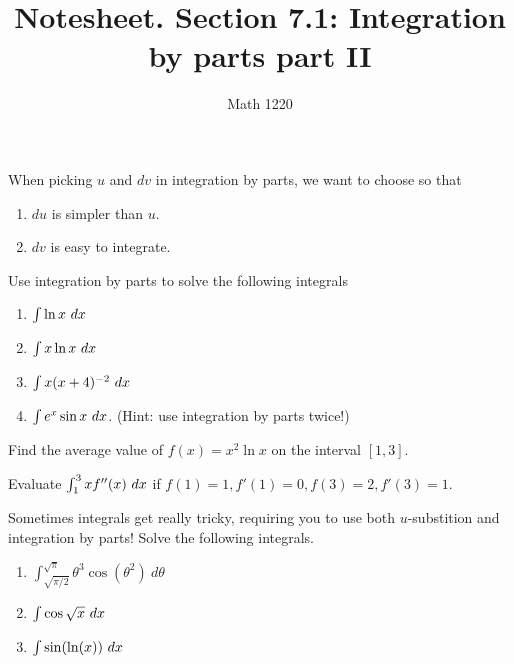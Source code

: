 \documentclass[12pt, a4paper]{article}
\author{Math 1220}
\title{Notesheet. Section 7.1: 
  Integration by parts part II}
\date{}
\begin{document}
\maketitle
\nameline
\begin{rmk}
  When picking \(u\) and \(dv\) in integration by parts, we want to
  choose so that
  \begin{enumerate}
  \item \(du\) is simpler than \(u\).
  \item \(dv\) is easy to integrate.
  \end{enumerate}
\end{rmk}
\begin{ex}
  Use integration by parts to solve the following integrals
  \begin{enumerate}
  \item \(\int \ln x \ d x\)
    \vspace{1in}
  \item \(\int x \ln x \ d x\)
    \vspace{1in}
  \item \(\int x (x+4)^{-2} \ d x\)
    \vspace{1in}
  \item \(\int e^x \sin x \ d x\). (Hint: use integration by parts twice!)
  \end{enumerate}
\end{ex}
\begin{ex}
  Find the average value of \(f(x) = x^2 \ln x\) on the interval \([1,3]\).
\end{ex}
\begin{ex}
  Evaluate \(\int_1^3 x f''(x) \ d x\) if \(f(1) = 1, f'(1)=0, f(3)=2,
  f'(3)=1\).
\end{ex}
\begin{ex}
  Sometimes integrals get really tricky, requiring you to use both
  \(u\)-substition and integration by parts! Solve the following integrals.
  \begin{enumerate}
  \item \(\int_{\sqrt{\pi/2}}^{\sqrt{\pi}} \theta^3 \cos(\theta^2)\
    d\theta\)
    \vspace{1in}
  \item \(\int \cos \sqrt{x} \ d x\)
    \vspace{1in}
  \item \(\int \sin(\ln(x)) \ d x\)
  \end{enumerate}
\end{ex}
\end{document}
